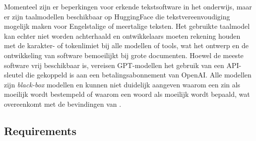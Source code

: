
Momenteel zijn er beperkingen voor erkende tekstsoftware in het onderwijs, maar er zijn taalmodellen beschikbaar op HuggingFace die tekstvereenvoudiging mogelijk maken voor Engelstalige of meertalige teksten. Het gebruikte taalmodel kan echter niet worden achterhaald en ontwikkelaars moeten rekening houden met de karakter- of tokenlimiet bij alle modellen of tools, wat het ontwerp en de ontwikkeling van software bemoeilijkt bij grote documenten. Hoewel de meeste software vrij beschikbaar is, vereisen GPT-modellen het gebruik van een API-sleutel die gekoppeld is aan een betalingsabonnement van OpenAI. Alle modellen zijn \textit{black-box} modellen en kunnen niet duidelijk aangeven waarom een zin als moeilijk wordt bestempeld of waarom een woord als moeilijk wordt bepaald, wat overeenkomt met de bevindingen van \textcite{Gooding2022}.

\subsection{Requirements}

